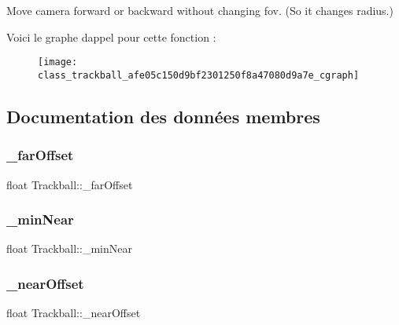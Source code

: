 Move camera forward or backward without changing fov. (So it changes radius.) 

Voici le graphe d\textquotesingle{}appel pour cette fonction \+:
\nopagebreak
\begin{figure}[H]
\begin{center}
\leavevmode
\texttt{[image: class\_trackball\_afe05c150d9bf2301250f8a47080d9a7e\_cgraph]}
\end{center}
\end{figure}


\subsection{Documentation des données membres}
\mbox{\label{class_trackball_aafee1403bc2961498e3df496b787679a}} 
\subsubsection{\texorpdfstring{\+\_\+far\+Offset}{\_farOffset}}
{\footnotesize\ttfamily float Trackball\+::\+\_\+far\+Offset\hspace{0.3cm}{\ttfamily [private]}}

\mbox{\label{class_trackball_a9130004320d2ebca9aee340403513f41}} 
\subsubsection{\texorpdfstring{\+\_\+min\+Near}{\_minNear}}
{\footnotesize\ttfamily float Trackball\+::\+\_\+min\+Near\hspace{0.3cm}{\ttfamily [private]}}

\mbox{\label{class_trackball_a08e3d5e8358c166c29d015f36c998bd1}} 
\subsubsection{\texorpdfstring{\+\_\+near\+Offset}{\_nearOffset}}
{\footnotesize\ttfamily float Trackball\+::\+\_\+near\+Offset\hspace{0.3cm}{\ttfamily [private]}}

